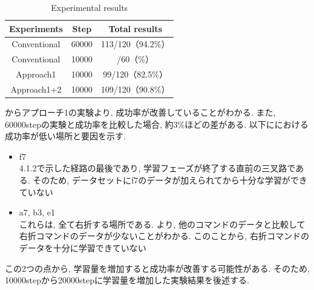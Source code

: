 \begin{itemize}

  \begin{table}[hbtp]
    \caption{Experimental results}
    \label{table:result4}
    \centering
    \begin{tabular}{|c|c|c|}
      \hline
      Experiments & Step & Total results\\
      \hline
      Conventional & 60000 & 113/120（94.2\%）\\
      \hline
      Conventional & 10000 & /60（\%）\\
      \hline
      Approach1 & 10000 & 99/120（82.5\%）\\
      \hline
      Approach1+2 & 10000 & 109/120（90.8\%）\\
      \hline
    \end{tabular}
  \end{table}


  からアプローチ1の実験より, 成功率が改善していることがわかる. また, 60000stepの実験と成功率を比較した場合, 約3\%ほどの差がある. 
  以下ににおける成功率が低い場所と要因を示す.
  \begin{itemize}
    \item f7\\
    4.1.2で示した経路の最後であり, 学習フェーズが終了する直前の三叉路である. そのため, データセットにf7のデータが加えられてから十分な学習ができていない
    \item a7, b3, e1\\
    これらは, 全て右折する場所である. より, 他のコマンドのデータと比較して右折コマンドのデータが少ないことがわかる. このことから, 右折コマンドのデータを十分に学習できていない
  \end{itemize} 

  この2つの点から, 学習量を増加すると成功率が改善する可能性がある. そのため, 10000stepから20000stepに学習量を増加した実験結果を後述する.

  \newpage



\end{itemize}
